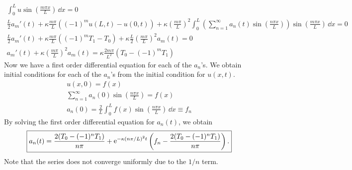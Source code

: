 {\begin{Solution}
\begin{gather*}
    \int_0^L u \sin \left( \frac{m \pi x}{L} \right) \,\dd x = 0 \\
    \frac{L}{2} a_m'(t) 
    + \kappa \frac{m \pi}{L} \left( (-1)^m u(L,t) - u(0,t) \right)
    + \kappa \left( \frac{m \pi}{L} \right)^2
    \int_0^L \left( \sum_{n=1}^\infty a_n(t) \sin \left( \frac{n \pi x}{L} \right)
    \right) \sin \left( \frac{m \pi x}{L} \right) \,\dd x = 0 \\
    \frac{L}{2} a_m'(t) 
    + \kappa \frac{m \pi}{L} \left( (-1)^m T_1 - T_0 \right)
    + \kappa \frac{L}{2} \left( \frac{m \pi}{L} \right)^2 a_m(t) = 0 \\
    a_m'(t) + \kappa \left( \frac{m \pi}{L} \right)^2 a_m(t) 
    = \kappa \frac{2 m \pi}{L^2} \left( T_0 - (-1)^m T_1 \right)
  \end{gather*}
  Now we have a first order differential equation for each of the $a_n$'s.
  We obtain initial conditions for each of the $a_n$'s from the initial 
  condition for $u(x,t)$.
  \begin{gather*}
    u(x,0) = f(x) \\
    \sum_{n=1}^\infty a_n(0) \sin \left( \frac{n \pi x}{L} \right) = f(x) \\
    a_n(0) = \frac{2}{L} \int_0^L f(x) \sin \left( \frac{n \pi x}{L} \right)\,\dd x
    \equiv f_n
  \end{gather*}
  By solving the first order differential equation for $a_n(t)$, we obtain
  \[
  \boxed{
    a_n(t) = \frac{ 2 (T_0 - (-1)^n T_1) }{ n \pi }
    + \mathop{\mathrm{e}}\nolimits^{- \kappa (n \pi / L)^2 t } \left( f_n - 
      \frac{ 2 (T_0 - (-1)^n T_1) }{ n \pi } \right).
    }
  \]
  Note that the series does not converge uniformly due to the $1/n$ term.





\end{Solution}}
